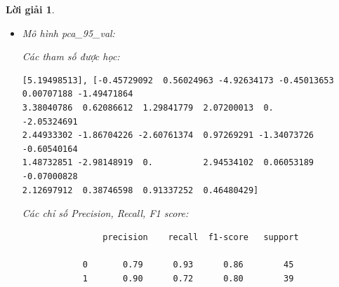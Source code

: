 \documentclass[14pt, a4paper]{article}
\theoremstyle{sltheorem}
\theoremstyle{soltheorem}
\newtheorem*{loigiai}{Lời giải}
\begin{document}
\begin{loigiai}
\begin{itemize}
        \begin{verbatim}
 [5.01008558], [-2.59900364  0.01571618  1.81045333 -0.55716291 -1.16394638  0.66186791
 2.61843254  1.46359887 -2.44642563 -0.3333156  -2.62535306 -2.12231965
-0.13917623 -0.0058026   0.51171118  0.95725468  0.30940549 -0.36714966
-0.31967372 -0.44059398  0.03623729 -0.90047965 -1.09174821 -1.16782886
-0.05135374  0.6045713  -0.03990656 -0.51752371 -0.67940085 -1.04508811
 3.35146048 -0.49775674 -0.86864338 -0.47129255  0.50253014  1.71647
 1.67635103 -0.59356493 -0.5907877   2.51271125  0.23495319 -0.74032569
 0.02028504 -1.59558781 -2.78973509 -1.48118666 -1.35053224 -2.05050341
-2.54213806  2.42511317 -1.58722598 -2.14496893 -0.72369936 -1.22740197
 0.55032604  0.99591841  1.33386345 -0.94688967 -1.82040189 -0.89923688]
        \end{verbatim}

        Các chỉ số Precision, Recall, F1 score:

        \begin{verbatim}
                precision    recall  f1-score   support

            0       0.86      0.84      0.85        45
            1       0.82      0.85      0.84        39
 
     accuracy                           0.85        84
    macro avg       0.84      0.85      0.84        84
 weighted avg       0.85      0.85      0.85        84
        \end{verbatim}

        \item Mô hình pca\_95\_val:
        
        Các tham số được học:

        \begin{verbatim}
[5.19498513], [-0.45729092  0.56024963 -4.92634173 -0.45013653  0.00707188 -1.49471864
3.38040786  0.62086612  1.29841779  2.07200013  0.         -2.05324691
2.44933302 -1.86704226 -2.60761374  0.97269291 -1.34073726 -0.60540164
1.48732851 -2.98148919  0.          2.94534102  0.06053189 -0.07000828
2.12697912  0.38746598  0.91337252  0.46480429]
        \end{verbatim}

        Các chỉ số Precision, Recall, F1 score:

        \begin{verbatim}
                precision    recall  f1-score   support

            0       0.79      0.93      0.86        45
            1       0.90      0.72      0.80        39
 

\end{verbatim}
\end{itemize}
\end{loigiai}
\end{document}
